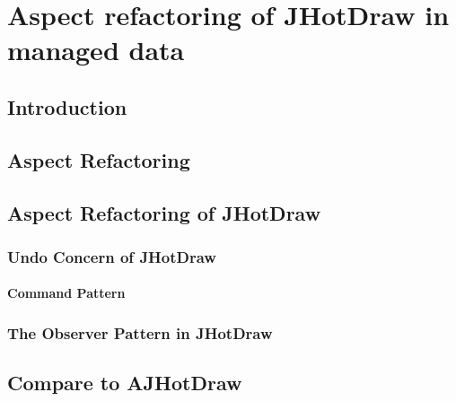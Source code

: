 
\chapter{Aspect refactoring of JHotDraw in managed data}\label{AspectRefactoring}

\section{Introduction}

\section{Aspect Refactoring}

\section{Aspect Refactoring of JHotDraw}
\subsection{Undo Concern of JHotDraw}\label{Undo JHotDraw}



\subsubsection{Command Pattern}

\subsection{The Observer Pattern in JHotDraw}\label{The Observer Pattern in JHotDraw}


\section{Compare to AJHotDraw}